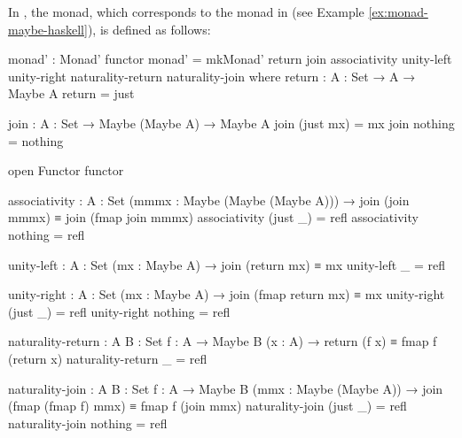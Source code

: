 \begin{example}
  \label{ex:monad-maybe-agda}

  In \agda, the  monad, which corresponds to the
   monad in \hask (see Example
  \ref{ex:monad-maybe-haskell}), is defined as follows:
  \begin{codeagda}
monad' : Monad' functor
monad' = mkMonad' return join associativity unity-left unity-right
                  naturality-return naturality-join
  where
    return : {A : Set} → A → Maybe A
    return = just

    join : {A : Set} → Maybe (Maybe A) → Maybe A
    join (just mx) = mx
    join nothing   = nothing

    open Functor functor

    associativity : {A : Set} (mmmx : Maybe (Maybe (Maybe A))) →
                    join (join mmmx) ≡ join (fmap join mmmx)
    associativity (just _) = refl
    associativity nothing  = refl

    unity-left : {A : Set} (mx : Maybe A) → join (return mx) ≡ mx
    unity-left _ = refl

    unity-right : {A : Set} (mx : Maybe A) →
                  join (fmap return mx) ≡ mx
    unity-right (just _) = refl
    unity-right nothing  = refl

    naturality-return : {A B : Set} {f : A → Maybe B} (x : A) →
                        return (f x) ≡ fmap f (return x)
    naturality-return _ = refl

    naturality-join : {A B : Set} {f : A → Maybe B}
                      (mmx : Maybe (Maybe A)) →
                      join (fmap (fmap f) mmx) ≡ fmap f (join mmx)
    naturality-join (just _) = refl
    naturality-join nothing  = refl
  \end{codeagda}

\end{example}


